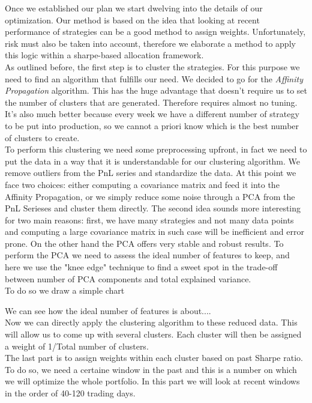 Once we established our plan we start dwelving into the details of our optimization. Our method is based on the idea that looking at recent performance of strategies can be a good method to assign weights. Unfortunately, risk must also be taken into account, therefore we elaborate a method to apply this logic within a sharpe-based allocation framework.\\
As outlined before, the first step is to cluster the strategies. For this purpose we need to find an algorithm that fulfills our need. We decided to go for the \textit{Affinity Propagation} algorithm. This has the huge advantage that doesn't require us to set the number of clusters that are generated. Therefore requires almost no tuning. It's also much better because every week we have a different number of strategy to be put into production, so we cannot a priori know which is the best number of clusters to create.\\
To perform this clustering we need some preprocessing upfront, in fact we need to put the data in a way that it is understandable for our clustering algorithm. We remove outliers from the PnL series and standardize the data. At this point we face two choices: either computing a covariance matrix and feed it into the Affinity Propagation, or we simply reduce some noise through a PCA from the PnL Serieses and cluster them directly. The second idea sounds more interesting for two main reasons: first, we have many strategies and not many data points and computing a large covariance matrix in such case will be inefficient and error prone. On the other hand the PCA offers very stable and robust results. To perform the PCA we need to assess the ideal number of features to keep, and here we use the "knee edge" technique  to find a sweet spot in the trade-off between number of PCA components and total explained variance.\\
To do so we draw a simple chart


We can see how the ideal number of features is about....\\
Now we can directly apply the clustering algorithm to these reduced data. This will allow us to come up with several clusters. Each cluster will then be assigned a weight of 1/Total number of clusters.\\
The last part is to assign weights within each cluster based on past Sharpe ratio. To do so, we need a certaine window in the past and this is a number on which we will optimize the whole portfolio. In this part we will look at recent windows in the order of 40-120 trading days.\\ 

